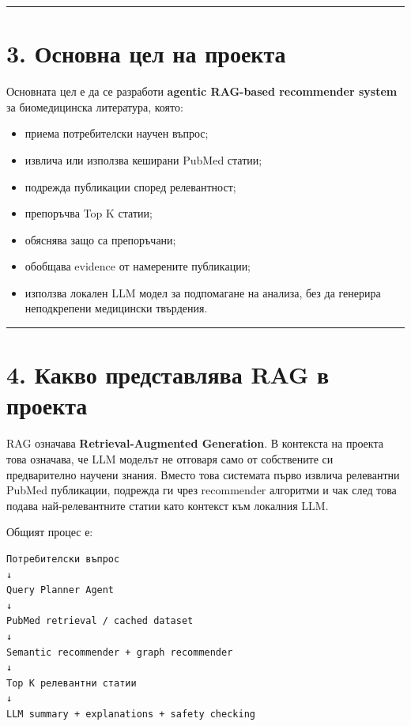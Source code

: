 \documentclass[12pt,a4paper]{article}
\providecommand{\tightlist}{\setlength{\itemsep}{0pt}\setlength{\parskip}{0pt}}
\begin{document}
\vspace{0.5em}\hrule\vspace{1.0em}

\section{3. Основна цел на проекта}\label{ux43eux441ux43dux43eux432ux43dux430-ux446ux435ux43b-ux43dux430-ux43fux440ux43eux435ux43aux442ux430}

Основната цел е да се разработи \textbf{agentic RAG-based recommender system} за биомедицинска литература, която:

\begin{itemize}
\tightlist
\item
  приема потребителски научен въпрос;
\item
  извлича или използва кеширани PubMed статии;
\item
  подрежда публикации според релевантност;
\item
  препоръчва Top K статии;
\item
  обяснява защо са препоръчани;
\item
  обобщава evidence от намерените публикации;
\item
  използва локален LLM модел за подпомагане на анализа, без да генерира неподкрепени медицински твърдения.
\end{itemize}

\vspace{0.5em}\hrule\vspace{1.0em}

\section{4. Какво представлява RAG в проекта}\label{ux43aux430ux43aux432ux43e-ux43fux440ux435ux434ux441ux442ux430ux432ux43bux44fux432ux430-rag-ux432-ux43fux440ux43eux435ux43aux442ux430}

RAG означава \textbf{Retrieval-Augmented Generation}. В контекста на проекта това означава, че LLM моделът не отговаря само от собствените си предварително научени знания. Вместо това системата първо извлича релевантни PubMed публикации, подрежда ги чрез recommender алгоритми и чак след това подава най-релевантните статии като контекст към локалния LLM.

Общият процес е:

\begin{verbatim}
Потребителски въпрос
↓
Query Planner Agent
↓
PubMed retrieval / cached dataset
↓
Semantic recommender + graph recommender
↓
Top K релевантни статии
↓
LLM summary + explanations + safety checking
\end{verbatim}
\end{document}
